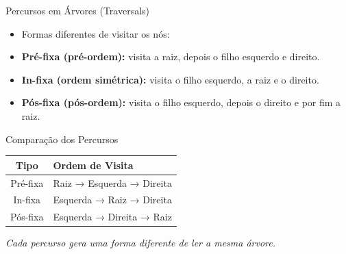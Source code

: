 \begin{frame}{Percursos em Árvores (Traversals)}
  \begin{itemize}
    \item Formas diferentes de visitar os nós:
    \item \textbf{Pré-fixa (pré-ordem):} visita a raiz, depois o filho esquerdo e direito.
    \item \textbf{In-fixa (ordem simétrica):} visita o filho esquerdo, a raiz e o direito.
    \item \textbf{Pós-fixa (pós-ordem):} visita o filho esquerdo, depois o direito e por fim a raiz.
  \end{itemize}
\end{frame}

\begin{frame}{Comparação dos Percursos}
  \centering
  \begin{tabular}{|c|l|}
    \hline
    \textbf{Tipo} & \textbf{Ordem de Visita} \\
    \hline
    Pré-fixa & Raiz → Esquerda → Direita \\
    In-fixa & Esquerda → Raiz → Direita \\
    Pós-fixa & Esquerda → Direita → Raiz \\
    \hline
  \end{tabular}
  \vspace{0.5cm}


  \textit{Cada percurso gera uma forma diferente de ler a mesma árvore.}
\end{frame}
